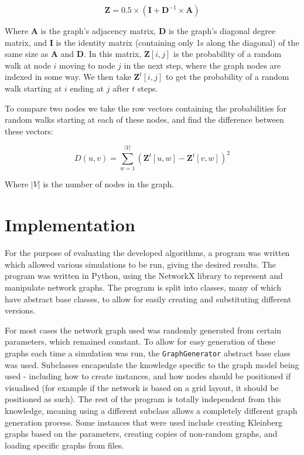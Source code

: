 \documentclass[bsc,frontabs,twoside,singlespacing,parskip,deptreport]{infthesis}     %
\begin{document}
\begin{equation}
\textbf{Z} = 0.5 \times (\textbf{I} + \textbf{D}^{-1} \times \textbf{A})
\end{equation}

Where $\textbf{A}$ is the graph's adjacency matrix, $\textbf{D}$ is the graph's diagonal degree matrix, and $\textbf{I}$ is the identity matrix (containing only 1s along the diagonal) of the same size as $\textbf{A}$ and $\textbf{D}$. In this matrix, $\textbf{Z}[i, j]$ is the probability of a random walk at node $i$ moving to node $j$ in the next step, where the graph nodes are indexed in some way. We then take $\textbf{Z}^{t}[i, j]$ to get the probability of a random walk starting at $i$ ending at $j$ after $t$ steps.

\pagebreak

To compare two nodes we take the row vectors containing the probabilities for random walks starting at each of these nodes, and find the difference between these vectors:

\begin{equation}
D(u, v) = \sum_{w=1}^{|V|} (\textbf{Z}^{t}[u, w] - \textbf{Z}^{t}[v, w])^{2}
\end{equation}

Where $|V|$ is the number of nodes in the graph.

\chapter{Implementation} \label{chapter3}
For the purpose of evaluating the developed algorithms, a program was written which allowed various simulations to be run, giving the desired results. The program was written in Python, using the NetworkX library\cite{NetworkX} to represent and manipulate network graphs. The program is split into classes, many of which have abstract base classes, to allow for easily creating and substituting different versions.

For most cases the network graph used was randomly generated from certain parameters, which remained constant. To allow for easy generation of these graphs each time a simulation was run, the \texttt{GraphGenerator} abstract base class was used. Subclasses encapsulate the knowledge specific to the graph model being used - including how to create instances, and how nodes should be positioned if visualised (for example if the network is based on a grid layout, it should be positioned as such). The rest of the program is totally independent from this knowledge, meaning using a different subclass allows a completely different graph generation process. Some instances that were used include creating Kleinberg graphs based on the parameters, creating copies of non-random graphs, and loading specific graphs from files.
\end{document}
